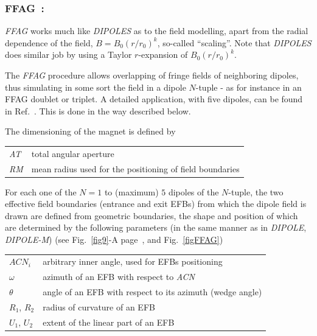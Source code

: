 {\newpage


\subsubsection*{FFAG~: \FFAGTitl~\cite{reportNIMFFAG,reportICFAFFAG}} \label{FFAG}   
\medskip

\noindent \textsl{FFAG} works much like \textsl{DIPOLES} 
as to the field modelling, apart from the  radial dependence of the field, $B=B_0(r/r_0)^k$, so-called ``scaling''. 
Note that \textsl{DIPOLES} does similar job by using a Taylor $r$-expansion of $B_0(r/r_0)^k$. 

\medskip

\noindent The \textsl{FFAG} procedure allows overlapping of fringe fields of neighboring dipoles, 
thus simulating in some sort the field in a dipole $N$-tuple - as for instance in an FFAG doublet 
or triplet. A detailed application, with 
five dipoles, can be found in Ref.~\cite{reportNIMFFAG}. This is done in the way described below. 

\medskip

\noindent  The dimensioning of the magnet is defined by

\medskip

 \begin{tabular}{>{\sl}l!{~:}l}
	 AT &  total angular aperture \\
	 RM & mean radius used for the positioning of field boundaries\\
 \end{tabular}

\medskip

\noindent For each one of the $N=1$ to (maximum) $5$ dipoles of the  $N$-tuple, 
the two  effective field boundaries (entrance and exit EFBs) from which  the dipole field  is drawn are
defined from geometric boundaries, the shape and position of which are determined by the 
following parameters (in the same manner as in \textsl{DIPOLE}, \textsl{DIPOLE-M})
 (see Fig.~\ref{fig9}-A page~\pageref{fig9}, and Fig.~\ref{figFFAG}) 

\medskip

\begin{tabular}{l!{~:}l}
	$ACN_i$  & arbitrary inner angle, used for EFBs positioning  \\
	$\omega$ &  azimuth of an EFB with respect to  \textsl{ACN}\\
	$\theta$ & angle of an EFB with respect to its azimuth (wedge angle)\\ 
	$R_1$, $R_2$  &  radius of curvature of an EFB\\
	$U_1$, $U_2$  &  extent of the linear part of an EFB  \\
\end{tabular}

}
